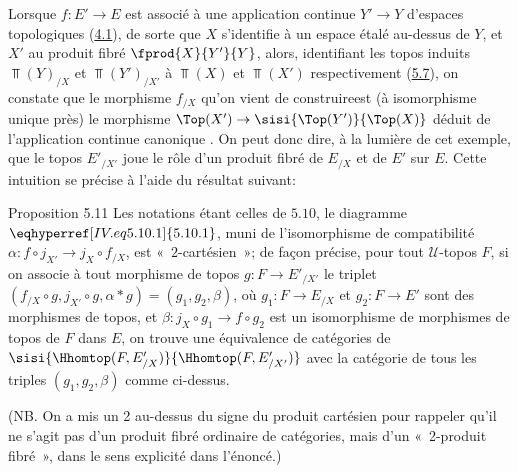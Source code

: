 \documentclass[10pt]{../fichiers-configuration-latex/smfart}
\begin{document}
\subsubsection{}
Lorsque $f:E'\rightarrow E$ est associé à une application
continue $Y'\rightarrow Y$ d'espaces topologiques
(\hyperref[IV.subsec4.1]{4.1}), de sorte que $X$ s'identifie à un espace
étalé au-dessus de $Y$, et $X'$ au produit fibré
$\fprod{X}{Y'}{Y}$, alors, identifiant les topos induits
$\Top(Y)_{/X}$ et $\Top(Y')_{/X'}$ à $\Top(X)$ et $\Top(X')$
respectivement (\hyperref[IV.subsec5.7]{5.7}), on constate que le morphisme
$f_{/X}$ qu'on vient de construire\pageoriginale est (à
isomorphisme unique près) le morphisme $\Top(X')\rightarrow
\sisi{\Top(Y')}{\Top(X)}$ déduit de l'application continue canonique
. On peut donc dire, à la lumière de cet
exemple, que le topos $E'_{/X'}$ joue le rôle d'un produit fibré
de $E_{/X}$ et de $E'$ sur $E$. Cette intuition se précise à
l'aide du résultat suivant:

\begin{enonce*}{Proposition 5.11}
Les notations étant celles de $\hyperref[IV.subsec5.10]{5.10}$, le diagramme
$\eqhyperref[IV.eq5.10.1]{5.10.1}$, muni de l'isomorphisme de compatibilité
$\alpha:f\circ j_{X'}\rightarrow j_X\circ f_{/X}$, est « $2$-cartésien »; de façon précise, pour tout
$𝒰$-topos $F$, si on associe à tout morphisme de topos
$g:F\rightarrow E'_{/X'}$ le triplet $(f_{/X}\circ g, j_{X'}\circ g,
\alpha\ast g)=(g_1, g_2,\beta)$, où $g_1:F\rightarrow E_{/X}$ et
$g_2:F\rightarrow E'$ sont des morphismes de topos, et
$\beta:j_X\circ g_1\rightarrow f\circ g_2$ est un isomorphisme de
morphismes de topos de $F$ dans $E$, on trouve une équivalence de
catégories de $\sisi{\Hhomtop(F,E'_{/X})}{\Hhomtop(F,E'_{/X'})}$ avec la catégorie
 de
tous les triples $(g_1,g_2,\beta)$ comme ci-dessus.
\end{enonce*}

(NB. On a mis un 2 au-dessus du signe du produit cartésien pour
rappeler qu'il ne s'agit pas d'un produit fibré ordinaire de
catégories, mais d'un « 2-produit fibré », dans le sens
explicité dans l'énoncé.)
\end{document}
